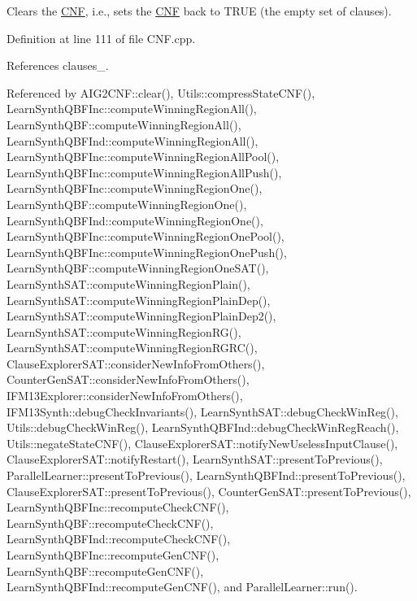 Clears the \hyperlink{classCNF}{C\-N\-F}, i.\-e., sets the \hyperlink{classCNF}{C\-N\-F} back to T\-R\-U\-E (the empty set of clauses). 



Definition at line 111 of file C\-N\-F.\-cpp.



References clauses\-\_\-.



Referenced by A\-I\-G2\-C\-N\-F\-::clear(), Utils\-::compress\-State\-C\-N\-F(), Learn\-Synth\-Q\-B\-F\-Inc\-::compute\-Winning\-Region\-All(), Learn\-Synth\-Q\-B\-F\-::compute\-Winning\-Region\-All(), Learn\-Synth\-Q\-B\-F\-Ind\-::compute\-Winning\-Region\-All(), Learn\-Synth\-Q\-B\-F\-Inc\-::compute\-Winning\-Region\-All\-Pool(), Learn\-Synth\-Q\-B\-F\-Inc\-::compute\-Winning\-Region\-All\-Push(), Learn\-Synth\-Q\-B\-F\-Inc\-::compute\-Winning\-Region\-One(), Learn\-Synth\-Q\-B\-F\-::compute\-Winning\-Region\-One(), Learn\-Synth\-Q\-B\-F\-Ind\-::compute\-Winning\-Region\-One(), Learn\-Synth\-Q\-B\-F\-Inc\-::compute\-Winning\-Region\-One\-Pool(), Learn\-Synth\-Q\-B\-F\-Inc\-::compute\-Winning\-Region\-One\-Push(), Learn\-Synth\-Q\-B\-F\-::compute\-Winning\-Region\-One\-S\-A\-T(), Learn\-Synth\-S\-A\-T\-::compute\-Winning\-Region\-Plain(), Learn\-Synth\-S\-A\-T\-::compute\-Winning\-Region\-Plain\-Dep(), Learn\-Synth\-S\-A\-T\-::compute\-Winning\-Region\-Plain\-Dep2(), Learn\-Synth\-S\-A\-T\-::compute\-Winning\-Region\-R\-G(), Learn\-Synth\-S\-A\-T\-::compute\-Winning\-Region\-R\-G\-R\-C(), Clause\-Explorer\-S\-A\-T\-::consider\-New\-Info\-From\-Others(), Counter\-Gen\-S\-A\-T\-::consider\-New\-Info\-From\-Others(), I\-F\-M13\-Explorer\-::consider\-New\-Info\-From\-Others(), I\-F\-M13\-Synth\-::debug\-Check\-Invariants(), Learn\-Synth\-S\-A\-T\-::debug\-Check\-Win\-Reg(), Utils\-::debug\-Check\-Win\-Reg(), Learn\-Synth\-Q\-B\-F\-Ind\-::debug\-Check\-Win\-Reg\-Reach(), Utils\-::negate\-State\-C\-N\-F(), Clause\-Explorer\-S\-A\-T\-::notify\-New\-Useless\-Input\-Clause(), Clause\-Explorer\-S\-A\-T\-::notify\-Restart(), Learn\-Synth\-S\-A\-T\-::present\-To\-Previous(), Parallel\-Learner\-::present\-To\-Previous(), Learn\-Synth\-Q\-B\-F\-Ind\-::present\-To\-Previous(), Clause\-Explorer\-S\-A\-T\-::present\-To\-Previous(), Counter\-Gen\-S\-A\-T\-::present\-To\-Previous(), Learn\-Synth\-Q\-B\-F\-Inc\-::recompute\-Check\-C\-N\-F(), Learn\-Synth\-Q\-B\-F\-::recompute\-Check\-C\-N\-F(), Learn\-Synth\-Q\-B\-F\-Ind\-::recompute\-Check\-C\-N\-F(), Learn\-Synth\-Q\-B\-F\-Inc\-::recompute\-Gen\-C\-N\-F(), Learn\-Synth\-Q\-B\-F\-::recompute\-Gen\-C\-N\-F(), Learn\-Synth\-Q\-B\-F\-Ind\-::recompute\-Gen\-C\-N\-F(), and Parallel\-Learner\-::run().

